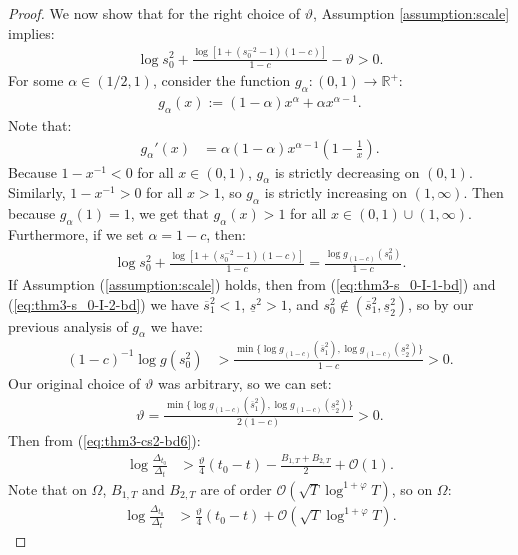 \begin{proof}
We now show that for the right choice of $\vartheta$, Assumption \ref{assumption:scale} implies:
\begin{align*}
    \log s_0^2 + \frac{\log[1 +  (s_0^{-2} -1)(1-c)]}{1-c} - \vartheta > 0.
\end{align*}
For some $\alpha \in (1/2,1)$, consider the function $g_\alpha: (0,1) \to \mathbb{R}^+$:
\begin{align*}
    g_\alpha(x) := (1-\alpha)x^\alpha + \alpha x^{\alpha - 1}.
\end{align*}
Note that:
\begin{align*}
    g_\alpha'(x) &= \alpha(1-\alpha)x^{\alpha-1}\left(1 - \frac{1}{x}
    \right).
\end{align*}
Because $1 - x^{-1} < 0$ for all $x \in (0,1)$, $g_\alpha$ is strictly decreasing on $(0,1)$. Similarly, $1 - x^{-1} > 0$ for all $x > 1$, so $g_\alpha$ is strictly increasing on $(1,\infty)$. Then because $g_\alpha(1) = 1$, we get that $g_\alpha(x) > 1$ for all $x \in (0,1)\cup(1,\infty)$. Furthermore, if we set $\alpha = 1 - c$, then:
\begin{align*}
    \log s_0^2 + \frac{\log[1 +  (s_0^{-2} -1)(1-c)]}{1-c} = \frac{\log g_{(1-c)}(s_0^2)}{1-c}.
\end{align*}
If Assumption (\ref{assumption:scale}) holds, then from (\ref{eq:thm3-s_0-I-1-bd}) and (\ref{eq:thm3-s_0-I-2-bd}) we have $\overline{s}_1^2 < 1$, $\underline{s}^2 > 1$, and $s_0^2 \not\in (\overline{s}_1^2, \underline{s}^2_2)$, so by our previous analysis of $g_\alpha$ we have:
\begin{align*}
    (1-c)^{-1}\log g(s_0^2) &> \frac{\min\{\log g_{(1-c)}(\overline{s}^2_1), \log g_{(1-c)}(\underline{s}^2_2)\}}{1-c} > 0.
\end{align*}
Our original choice of $\vartheta$ was arbitrary, so we can set:
\begin{align*}
    \vartheta = \frac{\min\{\log g_{(1-c)}(\overline{s}^2_1), \log g_{(1-c)}(\underline{s}^2_2)\}}{2(1-c)} > 0.
\end{align*}
Then from (\ref{eq:thm3-cs2-bd6}):
\begin{align}
    \log \frac{\Delta_{t_0}}{\Delta_t} &> \frac{\vartheta}{4}(t_0-t) - \frac{B_{1,T} + B_{2,T}}{2}  +  \mathcal{O}(1).   
\end{align}
Note that on $\Omega$, $B_{1,T}$ and $B_{2,T}$ are of order $\mathcal{O}(\sqrt{T}\log^{1+\varphi}T)$, so on $\Omega$:
\begin{align*}
    \log \frac{\Delta_{t_0}}{\Delta_t} &> \frac{\vartheta}{4}(t_0-t) + \mathcal{O}(\sqrt{T}\log^{1+\varphi}T). 

\end{align*}
\end{proof}
